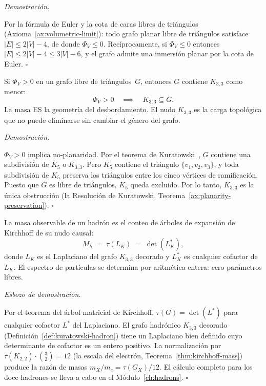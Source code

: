 \documentclass[11pt, a4paper, openany]{book}
\renewenvironment{proof}[1][Demostraci\'on]{%
  \par\noindent\textit{#1.}\quad
}{\hfill$\square$\par\medskip}
\begin{document}
\begin{proof}
Por la f\'ormula de Euler y la cota de caras libres de tri\'angulos
(Axioma~\ref{ax:volumetric-limit}): todo grafo planar libre de
tri\'angulos satisface $|E| \leq 2|V| - 4$, de donde $\Phi_V \leq 0$.
Rec\'iprocamente, si $\Phi_V \leq 0$ entonces
$|E| \leq 2|V| - 4 \leq 3|V| - 6$, y el grafo admite una inmersi\'on
planar por la cota de Euler.
\end{proof}

\begin{theorem}
\label{thm:generator-of-mass}
Si $\Phi_V > 0$ en un grafo libre de tri\'angulos~$G$, entonces $G$
contiene $K_{3,3}$ como menor:
\begin{equation}
\label{eq:generator-of-mass}
  \Phi_V > 0 \quad\implies\quad K_{3,3} \subseteq G.
\end{equation}
La masa ES la geometr\'ia del desbordamiento. El nudo $K_{3,3}$ es
la carga topol\'ogica que no puede eliminarse sin cambiar el g\'enero
del grafo.
\end{theorem}

\begin{proof}
$\Phi_V > 0$ implica no-planaridad. Por el teorema de
Kuratowski~\cite{kuratowski1930}, $G$ contiene una subdivisi\'on de
$K_5$ o $K_{3,3}$. Pero $K_5$ contiene el tri\'angulo
$\{v_1, v_2, v_3\}$, y toda subdivisi\'on de $K_5$ preserva los
tri\'angulos entre los cinco v\'ertices de ramificaci\'on. Puesto que
$G$ es libre de tri\'angulos, $K_5$ queda excluido. Por lo tanto,
$K_{3,3}$ es la \'unica obstrucci\'on (la Resoluci\'on de Kuratowski,
Teorema~\ref{ax:planarity-preservation}).
\end{proof}

\begin{theorem}
\label{thm:equation-of-flow}
La masa observable de un hadr\'on es el conteo de \'arboles de
expansi\'on de Kirchhoff de su nudo causal:
\begin{equation}
\label{eq:equation-of-flow}
  M_h \;=\; \tau(L_K) \;=\; \det(L_K^*),
\end{equation}
donde $L_K$ es el Laplaciano del grafo $K_{3,3}$ decorado y $L_K^*$
es cualquier cofactor de $L_K$. El espectro de part\'iculas se
determina por aritm\'etica entera: cero par\'ametros libres.
\end{theorem}

\begin{proof}[Esbozo de demostraci\'on]
Por el teorema del \'arbol matricial de Kirchhoff,
$\tau(G) = \det(L^*)$ para cualquier cofactor $L^*$ del Laplaciano. El
grafo hadr\'onico $K_{3,3}$ decorado
(Definici\'on~\ref{def:kuratowski-hadron}) tiene un Laplaciano bien
definido cuyo determinante de cofactor es un entero positivo. La
normalizaci\'on por $\tau(K_{2,2}) \cdot \binom{3}{2} = 12$ (la escala
del electr\'on, Teorema~\ref{thm:kirchhoff-mass}) produce la raz\'on de
masas $m_X/m_e = \tau(G_X)/12$. El c\'alculo completo para los doce
hadrones se lleva a cabo en el M\'odulo~\ref{ch:hadrons}.
\end{proof}
\end{document}
